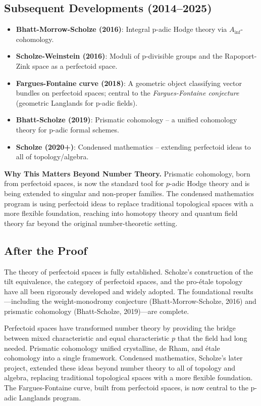 \subsection{Subsequent Developments (2014--2025)}
\begin{itemize}
\item \textbf{Bhatt-Morrow-Scholze (2016)}: Integral p-adic Hodge theory via $A_{\text{inf}}$-cohomology.
\item \textbf{Scholze-Weinstein (2016)}: Moduli of p-divisible groups and the Rapoport-Zink space as a perfectoid space.
\item \textbf{Fargues-Fontaine curve (2018)}: A geometric object classifying vector bundles on perfectoid spaces; central to the \emph{Fargues-Fontaine conjecture} (geometric Langlands for p-adic fields).
\item \textbf{Bhatt-Scholze (2019)}: Prismatic cohomology -- a unified cohomology theory for p-adic formal schemes.
\item \textbf{Scholze (2020+)}: Condensed mathematics -- extending perfectoid ideas to all of topology/algebra.
\end{itemize}

\textbf{Why This Matters Beyond Number Theory.} Prismatic cohomology, born from perfectoid spaces, is now the standard tool for $p$-adic Hodge theory and is being extended to singular and non-proper families. The condensed mathematics program is using perfectoid ideas to replace traditional topological spaces with a more flexible foundation, reaching into homotopy theory and quantum field theory far beyond the original number-theoretic setting.

\subsection{After the Proof}

The theory of perfectoid spaces is fully established. Scholze's construction of the tilt equivalence, the category of perfectoid spaces, and the pro-étale topology have all been rigorously developed and widely adopted. The foundational results---including the weight-monodromy conjecture (Bhatt-Morrow-Scholze, 2016) and prismatic cohomology (Bhatt-Scholze, 2019)---are complete.

Perfectoid spaces have transformed number theory by providing the bridge between mixed characteristic and equal characteristic $p$ that the field had long needed. Prismatic cohomology unified crystalline, de Rham, and étale cohomology into a single framework. Condensed mathematics, Scholze's later project, extended these ideas beyond number theory to all of topology and algebra, replacing traditional topological spaces with a more flexible foundation. The Fargues-Fontaine curve, built from perfectoid spaces, is now central to the p-adic Langlands program.


